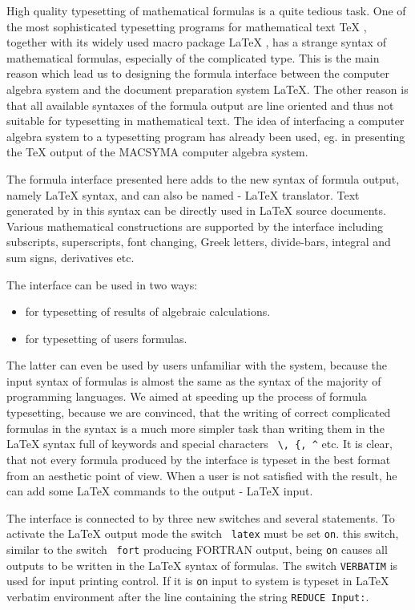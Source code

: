 
High quality typesetting of mathematical formulas is a quite tedious
task.  One of the most sophisticated typesetting programs for
mathematical text \TeX{} \cite{Knuth:84}, together with its widely used
macro package \LaTeX{} \cite{Lamport:86}, has a strange syntax of
mathematical formulas, especially of the complicated type.  This is the
main reason which lead us to designing the formula interface between the
computer algebra system \REDUCE{} and the document preparation system
\LaTeX{}.  The other reason is that all available syntaxes of the
\REDUCE{} formula output are line oriented and thus not suitable for
typesetting in mathematical text.  The idea of interfacing a computer
algebra system to a typesetting program has already been used, eg.  in
\cite{Fateman:87} presenting the \TeX{} output of the MACSYMA computer
algebra system.

The formula interface presented here adds to \REDUCE{} the new syntax of
formula output, namely \LaTeX{} syntax, and can also be named \REDUCE{} -
\LaTeX{} translator.  Text generated by \REDUCE{} in this syntax can be
directly used in \LaTeX{} source documents.  Various mathematical
constructions are supported by the interface including subscripts,
superscripts, font changing, Greek letters, divide-bars, integral and
sum signs, derivatives etc.

The interface can be used in two ways:
\begin{itemize}
\item for typesetting of results of \REDUCE{} algebraic calculations.
\item for typesetting of users formulas.
\end{itemize}

The latter can even be used by users unfamiliar with the \REDUCE{}
system, because the \REDUCE{} input syntax of formulas is almost the
same as the syntax of the majority of programming languages.  We aimed
at speeding up the process of formula typesetting, because we are
convinced, that the writing of correct complicated formulas in the
\REDUCE{} syntax is a much more simpler task than writing them in the
\LaTeX{} syntax full of keywords and special characters \verb+ \, {, ^+
etc.  It is clear, that not every formula produced by the interface is
typeset in the best format from an aesthetic point of view.  When a user
is not satisfied with the result, he can add some \LaTeX{} commands to the
\REDUCE{} output - \LaTeX{} input.

The interface is connected to \REDUCE{} by three new switches and
several statements.  To activate the \LaTeX{} output mode the switch {\tt
latex} must be set {\tt on}.  this switch, similar to the switch {\tt
fort} producing FORTRAN output, being {\tt on} causes all outputs to be
written in the \LaTeX{} syntax of formulas.  The switch {\tt VERBATIM} is
used for input printing control.  If it is {\tt on} input to \REDUCE{} system
is typeset in \LaTeX{} verbatim environment after the line containing
the string {\tt REDUCE Input:}.

